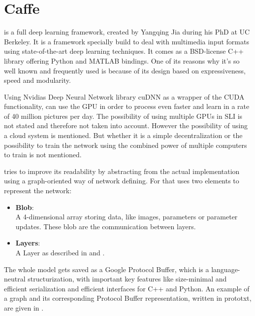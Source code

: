 \section{Caffe} \label{sec: Caffe}


\caffe is a full deep learning framework, created by Yangqing Jia during his PhD at UC Berkeley. It is a framework specially build to deal with multimedia input formats using state-of-the-art deep learning techniques. It comes as a BSD-license C++ library offering Python and MATLAB bindings. One of its reasons why it's so well known and frequently used is because of its design based on expressiveness, speed and modularity.

Using Nvidias Deep Neural Network library cuDNN as a wrapper of the CUDA functionality, \caffe can use the GPU in order to process even faster and learn in a rate of 40 million pictures per day. The possibility of using multiple GPUs in SLI is not stated and therefore not taken into account. \cite{wiki:Caffe}
However the possibility of using a cloud system is mentioned. But whether it is a simple decentralization or the possibility to train the network using the combined power of multiple computers to train is not mentioned. \cite{jia2014caffe}

\caffe tries to improve its readability by abstracting from the actual implementation using a graph-oriented way of network defining. For that \caffe uses two elements to represent the network:
\begin{itemize}
	\item \textbf{Blob}:\\
		A 4-dimensional array storing data, like images, parameters or parameter updates. These blob are the communication between layers.
	\item \textbf{Layers}:\\
		A Layer as described in  and .
\end{itemize}
The whole model gets saved as a Google Protocol Buffer, which is a language-neutral structurization, with important key features like size-minimal and efficient serialization and efficient interfaces for C++ and Python. \cite{jia2014caffe} \cite{varda2008protocol}
An example of a graph and its corresponding Protocol Buffer representation, written in prototxt, are given in .




